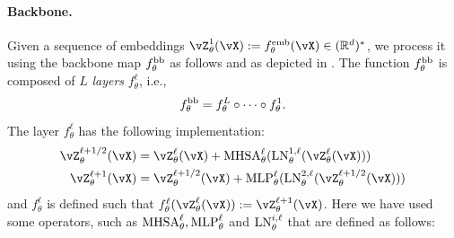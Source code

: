 \documentclass[../../book-main.tex]{subfiles}
\begin{document}
\paragraph{Backbone.} Given a sequence of embeddings \(\vZ_{\theta}^{1}(\vX) := f_{\theta}^{\emb}(\vX) \in (\R^{d})^{*}\), we process it using the backbone map \(f_{\theta}^{\mathrm{bb}}\) as follows and as depicted in . The function \(f_{\theta}^{\mathrm{bb}}\) is composed of \(L\) \textit{layers} \(f_{\theta}^{\ell}\), i.e.,
\begin{equation}
    f_{\theta}^{\mathrm{bb}} = f_{\theta}^{L} \circ \cdots \circ f_{\theta}^{1}.
\end{equation}
 The layer \(f_{\theta}^{\ell}\) has the following implementation:
\begin{align}\label{eq:vit-res-block}
    \vZ_{\theta}^{\ell + 1/2}(\vX)
    &= \vZ_{\theta}^{\ell}(\vX) + \MHSA_{\theta}^{\ell}(\LN_{\theta}^{1, \ell}(\vZ_{\theta}^{\ell}(\vX))) \\ 
    \vZ_{\theta}^{\ell + 1}(\vX)
    &= \vZ_{\theta}^{\ell + 1/2}(\vX) + \MLP_{\theta}^{\ell}(\LN_{\theta}^{2, \ell}(\vZ_{\theta}^{\ell + 1/2}(\vX)))
\end{align}
and \(f_{\theta}^{\ell}\) is defined such that \(f_{\theta}^{\ell}(\vZ_{\theta}^{\ell}(\vX)) := \vZ_{\theta}^{\ell + 1}(\vX)\). Here we have used some operators, such as \(\operatorname{MHSA}_{\theta}^{\ell}, \operatorname{MLP}_{\theta}^{\ell}\) and \(\operatorname{LN}_{\theta}^{i, \ell}\) that are defined as follows:
\end{document}
